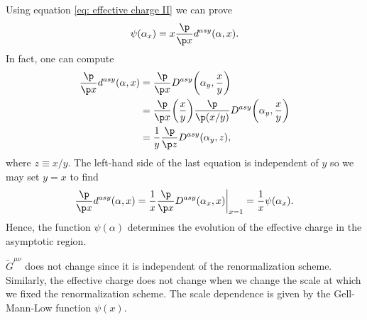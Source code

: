 Using equation \eqref{eq: effective charge II} we can prove
\begin{equation}
    \psi(\alpha_x) = x\frac{\p}{\p x}d^{asy}(\alpha,x).
\end{equation}
In fact, one can compute
\begin{equation}
    \begin{split}
        \frac{\p}{\p x}d^{asy}(\alpha,x) &= \frac{\p}{\p x}D^{asy}\bigg(\alpha_y,\frac{x}{y}\bigg) \\
        &= \frac{\p}{\p x}\bigg(\frac{x}{y}\bigg)\frac{\p}{\p(x/y)}D^{asy}\bigg(\alpha_y,\frac{x}{y}\bigg) \\
        &= \frac{1}{y}\frac{\p}{\p z}D^{asy}(\alpha_y,z),
    \end{split}
\end{equation}
where $z \equiv x/y$. The left-hand side of the last equation is independent of $y$ so we may set $y = x$ to find 
\begin{equation}
    \frac{\p}{\p x}d^{asy}(\alpha,x) = \frac{1}{x}\frac{\p}{\p x}D^{asy}(\alpha_x,x)\bigg|_{x = 1} = \frac{1}{x}\psi(\alpha_x).
\end{equation}
Hence, the function $\psi(\alpha)$ determines the evolution of the effective charge in the asymptotic region. 
\begin{obs}
    $\tilde{G}^{\mu\nu}$ does not change since it is independent of the renormalization scheme. Similarly, the effective charge does not change when we change the scale at which we fixed the renormalization scheme. The scale dependence is given by the Gell-Mann-Low function $\psi(x)$.
\end{obs}

